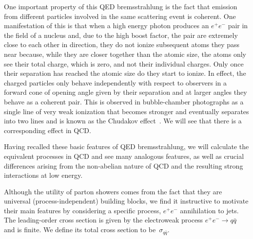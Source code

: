 One important property of this QED bremsstrahlung is the fact that
emission from different particles involved in the same scattering event
is coherent.  One manifestation of this is that when a high energy
photon produces an $e^+e^-$ pair in the field of a nucleus and, due to
the high boost factor, the pair are extremely close to each other in
direction, they do not ionize subsequent atoms they pass near because,
while they are closer together than the atomic size, the atoms only see
their total charge, which is zero, and not their individual charges.
Only once their separation has reached the atomic size do they start to
ionize.  In effect, the charged particles only behave independently with
respect to observers in a forward cone of opening angle given by their
separation and at larger angles they behave as a coherent pair.  This is
observed in bubble-chamber photographs as a single line of very weak
ionization that becomes stronger and eventually separates into two lines
and is known as the Chudakov effect~\cite{Chudakov:55ce}.  We will see
that there is a corresponding effect in QCD.

Having recalled these basic features of QED bremsstrahlung, we will
calculate the equivalent processes in QCD and see many analogous
features, as well as crucial differences arising from the non-abelian
nature of QCD and the resulting strong interactions at low energy.


Although the utility of parton showers comes from the fact that they are
universal (process-independent) building blocks, we find it instructive
to motivate their main features by considering a specific process,
$e^+e^-$ annihilation to jets.  The leading-order cross section is given
by the electroweak process $e^+e^-\to q\bar{q}$ and is finite.  We
define its total cross section to be~$\sigma_{q\bar q}$.

